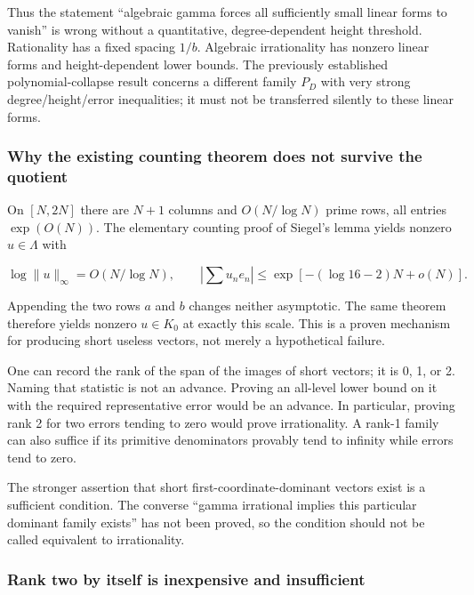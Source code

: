 \documentclass[11pt,a4paper]{article}
\theoremstyle{definition}
\theoremstyle{remark}
\theoremstyle{plain}
\numberwithin{equation}{section}
\begin{document}
Thus the statement ``algebraic gamma forces all sufficiently small
linear forms to vanish'' is wrong without a quantitative,
degree-dependent height threshold. Rationality has a fixed spacing $1/b$.
Algebraic irrationality has nonzero linear forms and height-dependent
lower bounds. The previously established polynomial-collapse result
concerns a different family $P_D$ with very strong degree/height/error
inequalities; it must not be transferred silently to these linear forms.

\subsubsection{Why the existing counting theorem does not survive the
quotient}\label{sc:au:why-the-existing-counting-theorem-does-not-survive-the-quotient}

On $[N,2N]$ there are $N+1$ columns and $O(N/\log N)$ prime rows, all entries $\exp(O(N))$. The elementary counting proof of Siegel's lemma
yields nonzero $u\in\Lambda$ with

\[
\log\|u\|_\infty=O(N/\log N),\qquad
\left|\sum u_ne_n\right|
\le\exp[-(\log16-2)N+o(N)].
\]

Appending the two rows $a$ and $b$ changes neither asymptotic. The same
theorem therefore yields nonzero $u\in K_0$ at exactly this scale. This
is a proven mechanism for producing short useless vectors, not merely a
hypothetical failure.

One can record the rank of the span of the images of short vectors; it
is 0, 1, or 2. Naming that statistic is not an advance. Proving an
all-level lower bound on it with the required representative error would
be an advance. In particular, proving rank 2 for two errors tending to
zero would prove irrationality. A rank-1 family can also suffice if its
primitive denominators provably tend to infinity while errors tend to
zero.

The stronger assertion that short first-coordinate-dominant vectors
exist is a sufficient condition. The converse ``gamma irrational implies
this particular dominant family exists'' has not been proved, so the
condition should not be called equivalent to irrationality.

\subsubsection{Rank two by itself is inexpensive and
insufficient}\label{sc:au:rank-two-by-itself-is-inexpensive-and-insufficient}
\end{document}
